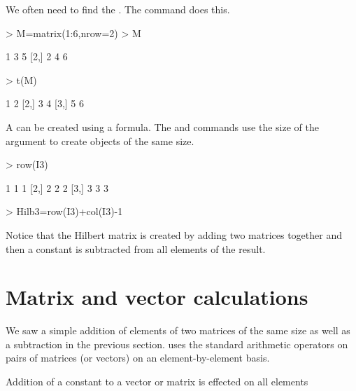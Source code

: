  
We often need to find the . The  command does this. 

\begin{Schunk}
\begin{Sinput}
> M=matrix(1:6,nrow=2) 
> M 
\end{Sinput}
\begin{Soutput}
     [,1] [,2] [,3]
[1,]    1    3    5
[2,]    2    4    6
\end{Soutput}
\begin{Sinput}
> t(M) 
\end{Sinput}
\begin{Soutput}
     [,1] [,2]
[1,]    1    2
[2,]    3    4
[3,]    5    6
\end{Soutput}
\end{Schunk}

 
A  can be created using a formula. The  and  commands use the size of the argument to create objects of the same size. 

\begin{Schunk}
\begin{Sinput}
> row(I3) 
\end{Sinput}
\begin{Soutput}
     [,1] [,2] [,3]
[1,]    1    1    1
[2,]    2    2    2
[3,]    3    3    3
\end{Soutput}
\begin{Sinput}
> Hilb3=row(I3)+col(I3)-1 
\end{Sinput}
\end{Schunk}

Notice that the Hilbert matrix is created by adding two matrices together and then a constant is subtracted from all elements of the result. 
 
\section{Matrix and vector calculations} 
 
We saw a simple addition of elements of two matrices of the same size as well as a subtraction in the previous section. \R{} uses the standard arithmetic operators on pairs of matrices (or vectors) on an element-by-element basis.  
 
Addition of a constant to a vector or matrix is effected on all elements 


